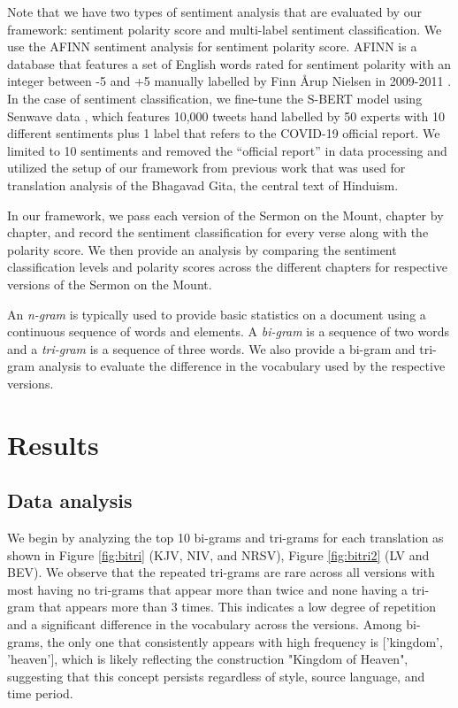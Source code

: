 \documentclass[5p,times]{elsarticle}
\begin{document}
Note that we have two types of sentiment analysis that are evaluated by our framework: sentiment polarity score and multi-label sentiment classification. 
We use the  AFINN sentiment analysis \cite{nielsen2011new} for sentiment polarity score.  AFINN is a database that features a  set of English words rated for sentiment polarity with an integer
between  -5 and +5 manually labelled by Finn {\AA}rup Nielsen in 2009-2011 \cite{nielsen2011afinn}. In the case of sentiment classification, we fine-tune the S-BERT model using Senwave data \cite{yang2020senwave}, which features 10,000 tweets hand labelled by 50 experts with 10 different sentiments plus 1 label that refers to the COVID-19 official report. We limited to 10 sentiments and removed the “official report” in data processing and utilized the setup of our framework from previous work   \cite{chandra2022semantic} that was used for translation analysis of the Bhagavad Gita, the central text of Hinduism. 


In our framework, we pass each version of the Sermon on the Mount, chapter by chapter, and record the sentiment classification for every verse along with the polarity score. We then provide an analysis by comparing the sentiment classification levels and polarity scores across the different chapters for respective versions of the Sermon on the Mount. 




 An \emph{n-gram} \cite{kumar2017introduction} is typically used to provide basic statistics on a document using a continuous sequence of words and elements.  A  \emph{bi-gram} is a sequence of two words and a \emph{tri-gram} is a sequence of three words. We also provide a bi-gram and tri-gram analysis to evaluate the difference in the vocabulary used by the respective versions. 





 
 
\section{Results}

\subsection{Data analysis}
 

We begin by analyzing the top 10 bi-grams and tri-grams for each translation as shown in Figure \ref{fig:bitri} (KJV, NIV, and NRSV), Figure \ref{fig:bitri2} (LV  and BEV). We observe that the repeated tri-grams are rare across all versions with most having no tri-grams that appear more than twice and none having a tri-gram that appears more than $3$ times. This indicates a low degree of repetition and a significant difference in the vocabulary across the versions. Among bi-grams, the only one that consistently appears with high frequency is  ['kingdom', 'heaven'], which is likely reflecting the construction "Kingdom of Heaven", suggesting that this concept persists regardless of style, source language, and time period.
\end{document}
